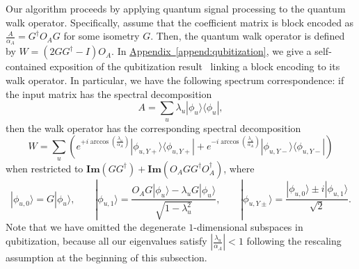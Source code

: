 \documentclass[letterpaper,onecolumn,11pt,accepted=2026-02-14]{quantumarticle}
\newcommand{\abs}[1]{\left\lvert#1\right\rvert}
\theoremstyle{remark}
\theoremstyle{plain}
\newcommand{\append}[1]{\hyperref[append:#1]{Appendix~\ref*{append:#1}}}
\newcommand{\ket}[1]{|#1\rangle}
\newcommand{\bra}[1]{\langle#1|}
\newcommand{\ketbra}[2]{\ket{#1}\!\bra{#2}}
\begin{document}
Our algorithm proceeds by applying quantum signal processing to the quantum walk operator. Specifically, assume that the coefficient matrix is block encoded as $\frac{A}{\alpha_A}=G^\dagger O_AG$ for some isometry $G$. Then, the quantum walk operator is defined by $W=\left(2GG^\dagger-I\right)O_A$. In \append{qubitization}, we give a self-contained exposition of the qubitization result~\cite{Low2016Qubitization} linking a block encoding to its walk operator. In particular, we have the following spectrum correspondence: if the input matrix has the spectral decomposition
\begin{equation}
    A=\sum_u\lambda_u\ketbra{\phi_u}{\phi_u},
\end{equation}
then the walk operator has the corresponding spectral decomposition
\begin{equation}
    W
    =\sum_{u}\left(e^{+ i\arccos\left(\frac{\lambda_u}{\alpha_A}\right)}\ketbra{\phi_{u,Y+}}{\phi_{u,Y+}}
    +e^{-i\arccos\left(\frac{\lambda_u}{\alpha_A}\right)}\ketbra{\phi_{u,Y-}}{\phi_{u,Y-}}\right)
\end{equation}
when restricted to $\mathbf{Im}\left(GG^\dagger\right)+\mathbf{Im}\left(O_AGG^\dagger O_A^\dagger\right)$, where
\begin{equation}
    \ket{\phi_{u,0}}=G\ket{\phi_u},\qquad
    \ket{\phi_{u,1}}=\frac{O_AG\ket{\phi_u}-\lambda_uG\ket{\phi_u}}{\sqrt{1-\lambda_u^2}},\qquad
    \ket{\phi_{u,Y\pm}}=\frac{\ket{\phi_{u,0}}\pm i\ket{\phi_{u,1}}}{\sqrt{2}}.
\end{equation}
Note that we have omitted the degenerate $1$-dimensional subspaces in qubitization, because all our eigenvalues satisfy $\abs{\frac{\lambda_u}{\alpha_A}}<1$ following the rescaling assumption at the beginning of this subsection.
\end{document}
